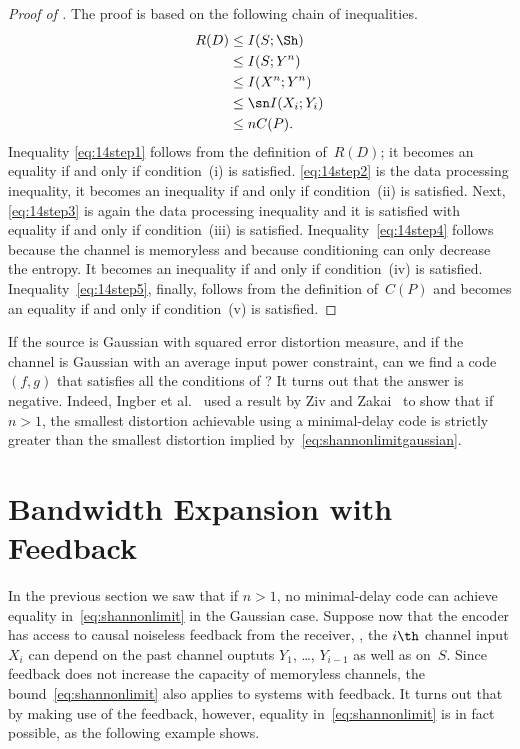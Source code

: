 \begin{proof}[Proof of ]
  The proof is based on the following chain of inequalities.
  \begin{align}
    \label{eq:14step1}
    R(D) &\le I(S; \Sh) \\
    \label{eq:14step2}
    &\le I(S; Y^n) \\
    \label{eq:14step3}
    &\le I(X^n; Y^n) \\
    \label{eq:14step4}
    &\le \sn I(X_i; Y_i)  \\
    \label{eq:14step5}
    &\le n C(P).
  \end{align}
  Inequality \eqref{eq:14step1} follows from the definition of~$R(D)$; it
  becomes an equality if and only if condition~(i) is satisfied.
  \eqref{eq:14step2} is the data processing inequality, it becomes an inequality
  if and only if condition~(ii) is satisfied. Next, \eqref{eq:14step3} is again
  the data processing inequality and it is satisfied with equality if and only
  if condition~(iii) is satisfied.  Inequality~\eqref{eq:14step4} follows
  because the channel is memoryless and because conditioning can only decrease
  the entropy. It becomes an inequality if and only if condition~(iv) is
  satisfied. Inequality~\eqref{eq:14step5}, finally, follows from the definition
  of~$C(P)$ and becomes an equality if and only if condition~(v) is satisfied.
\end{proof}

If the source is Gaussian with squared error distortion measure, and if the
channel is Gaussian with an average input power constraint, can we find a code
$(f,g)$ that satisfies all the conditions of ? It turns out that
the answer is negative. Indeed, Ingber et al.~\cite{IngberLZF2008} used a result
by Ziv and Zakai~\cite{ZivZ1973} to show that if $n>1$, the smallest distortion
achievable using a minimal-delay code is strictly greater than the smallest
distortion implied by~\eqref{eq:shannonlimitgaussian}.


\section{Bandwidth Expansion with Feedback}\label{sec:feedback}

In the previous section we saw that if $n > 1$, no minimal-delay code can
achieve equality in~\eqref{eq:shannonlimit} in the Gaussian case. 
Suppose now that the encoder has access to causal noiseless feedback from the
receiver, \ie, the $i\th$ channel input $X_i$ can depend on the past channel
ouptuts $Y_1$, \ldots, $Y_{i-1}$ as well as on~$S$. Since feedback does not
increase the capacity of memoryless channels, the bound~\eqref{eq:shannonlimit}
also applies to systems with feedback. It turns out that by making use of the
feedback, however, equality in~\eqref{eq:shannonlimit} is in fact possible, as
the following example shows.

